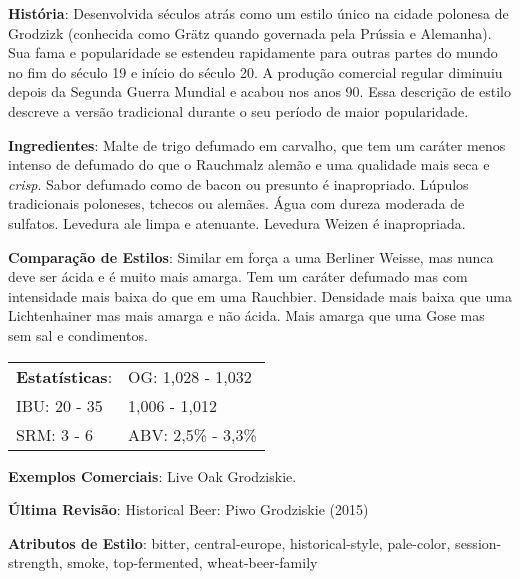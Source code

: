 \textbf{História}: Desenvolvida séculos atrás como um estilo único na cidade polonesa de Grodzizk (conhecida como Grätz quando governada pela Prússia e Alemanha). Sua fama e popularidade se estendeu rapidamente para outras partes do mundo no fim do século 19 e início do século 20. A produção comercial regular diminuiu depois da Segunda Guerra Mundial e acabou nos anos 90. Essa descrição de estilo descreve a versão tradicional durante o seu período de maior popularidade.

\textbf{Ingredientes}: Malte de trigo defumado em carvalho, que tem um caráter menos intenso de defumado do que o Rauchmalz alemão e uma qualidade mais seca e \textit{crisp}. Sabor defumado como de bacon ou presunto é inapropriado. Lúpulos tradicionais poloneses, tchecos ou alemães. Água com dureza moderada de sulfatos. Levedura ale limpa e atenuante. Levedura Weizen é inapropriada.

\textbf{Comparação de Estilos}: Similar em força a uma Berliner Weisse, mas nunca deve ser ácida e é muito mais amarga. Tem um caráter defumado mas com intensidade mais baixa do que em uma Rauchbier. Densidade mais baixa que uma Lichtenhainer mas mais amarga e não ácida. Mais amarga que uma Gose mas sem sal e condimentos.

\begin{tabular}{@{}p{35mm}p{35mm}@{}}
  \textbf{Estatísticas}: & OG: 1,028 - 1,032 \\
  IBU: 20 - 35  & 1,006 - 1,012  \\
  SRM: 3 - 6 & ABV: 2,5\% - 3,3\%
\end{tabular}

\textbf{Exemplos Comerciais}: Live Oak Grodziskie.

\textbf{Última Revisão}: Historical Beer: Piwo Grodziskie (2015)

\textbf{Atributos de Estilo}: bitter, central-europe, historical-style, pale-color, session-strength, smoke, top-fermented, wheat-beer-family
